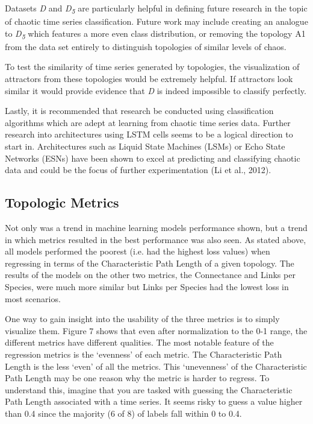 \documentclass[letterpaper, 10 pt, conference]{ieeeconf}  %
\begin{document}
    Datasets \textit{D} and \textit{D\textsubscript{5}} are particularly helpful in defining future research in the topic of chaotic time series classification. Future work may include creating an analogue to \textit{D\textsubscript{5}} which features a more even class distribution, or removing the topology A1 from the data set entirely to distinguish topologies of similar levels of chaos. 

    To test the similarity of time series generated by topologies, the visualization of attractors from these topologies would be extremely helpful. If attractors look similar it would provide evidence that \textit{D} is indeed impossible to classify perfectly. 
    
    Lastly, it is recommended that research be conducted using classification algorithms which are adept at learning from chaotic time series data. Further research into architectures using LSTM cells seems to be a logical direction to start in. Architectures such as Liquid State Machines (LSMs) or Echo State Networks (ESNs) have been shown to excel at predicting and classifying chaotic data and could be the focus of further experimentation (Li et al., 2012). 

\subsection{Topologic Metrics}

    Not only was a trend in machine learning models performance shown, but a trend in which metrics resulted in the best performance was also seen. As stated above, all models performed the poorest (i.e. had the highest loss values) when regressing in terms of the Characteristic Path Length of a given topology. The results of the models on the other two metrics, the Connectance and Links per Species, were much more similar but Links per Species had the lowest loss in most scenarios. 

    One way to gain insight into the usability of the three metrics is to simply visualize them. Figure 7 shows that even after normalization to the 0-1 range, the different metrics have different qualities. The most notable feature of the regression metrics is the ‘evenness’ of each metric. The Characteristic Path Length is the less ‘even’ of all the metrics. This ‘unevenness’ of the Characteristic Path Length may be one reason why the metric is harder to regress. To understand this, imagine that you are tasked with guessing the Characteristic Path Length associated with a time series. It seems risky to guess a value higher than 0.4 since the majority (6 of 8) of labels fall within 0 to 0.4. 
\end{document}
